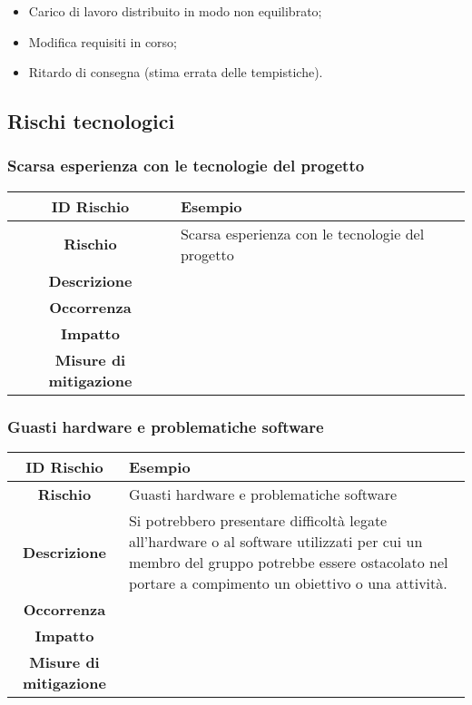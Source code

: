 \documentclass[10pt, a4paper]{article}
\begin{document}
{{{{{\begin{itemize}
    \item Carico di lavoro distribuito in modo non equilibrato;
    \item Modifica requisiti in corso;
    \item Ritardo di consegna (stima errata delle tempistiche).
\end{itemize}


\subsection{Rischi tecnologici}

\subsubsection{Scarsa esperienza con le tecnologie del progetto}

{\renewcommand{\arraystretch}{1.5}
\begin{tabularx}{\textwidth}{c|X}
\textbf{ID Rischio} & Esempio \\
\hline
\textbf{Rischio} & Scarsa esperienza con le tecnologie del progetto \\
\hline
\textbf{Descrizione} & \\
\hline
\textbf{Occorrenza} & \\
\hline
\textbf{Impatto} & \\
\hline
\textbf{Misure di mitigazione} & \\
\end{tabularx}


\subsubsection{Guasti hardware e problematiche software}

{\renewcommand{\arraystretch}{1.5}
\begin{tabularx}{\textwidth}{c|X}
\textbf{ID Rischio} & Esempio \\
\hline
\textbf{Rischio} & Guasti hardware e problematiche software \\
\hline
\textbf{Descrizione} & Si potrebbero presentare difficoltà legate all’hardware o al software utilizzati per cui un membro del gruppo potrebbe essere ostacolato nel portare a compimento un obiettivo o una attività. \\
\hline
\textbf{Occorrenza} & \\
\hline
\textbf{Impatto} & \\
\hline
\textbf{Misure di mitigazione} & \\
\end{tabularx}


}}}}}}}
\end{document}
